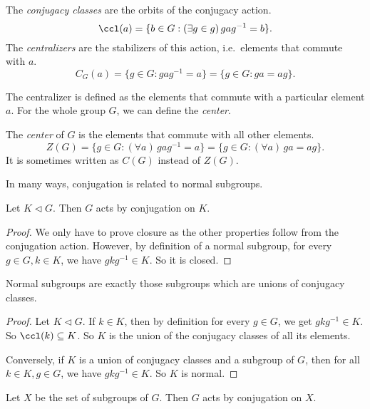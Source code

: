 \documentclass[a4paper]{article}
\begin{document}
\begin{defi}
  The \emph{conjugacy classes} are the orbits of the conjugacy action.
  \[
    \ccl(a) = \{b\in G: (\exists g\in g)\,gag^{-1} = b\}.
  \]
  The \emph{centralizers} are the stabilizers of this action, i.e.\ elements that commute with $a$.
  \[
    C_G(a) = \{g\in G: gag^{-1} = a\} = \{g\in G: ga = ag\}.
  \]
\end{defi}
The centralizer is defined as the elements that commute with a particular element $a$. For the whole group $G$, we can define the \emph{center}.

\begin{defi}
  The \emph{center} of $G$ is the elements that commute with all other elements.
  \[
    Z(G) = \{g\in G: (\forall a)\,gag^{-1} = a\} = \{g\in G: (\forall a)\,ga = ag\}.
  \]
  It is sometimes written as $C(G)$ instead of $Z(G)$.
\end{defi}

In many ways, conjugation is related to normal subgroups.
\begin{lemma}
  Let $K\lhd G$. Then $G$ acts by conjugation on $K$.
\end{lemma}

\begin{proof}
  We only have to prove closure as the other properties follow from the conjugation action. However, by definition of a normal subgroup, for every $g \in G, k \in K$, we have $gkg^{-1}\in K$. So it is closed.
\end{proof}

\begin{prop}
  Normal subgroups are exactly those subgroups which are unions of conjugacy classes.
\end{prop}

\begin{proof}
  Let $K\lhd G$. If $k\in K$, then by definition for every $g \in G$, we get $gkg^{-1}\in K$. So $\ccl(k)\subseteq K$. So $K$ is the union of the conjugacy classes of all its elements.

  Conversely, if $K$ is a union of conjugacy classes and a subgroup of $G$, then for all $k \in K, g \in G$, we have $gkg^{-1}\in K$. So $K$ is normal.
\end{proof}

\begin{lemma}
  Let $X$ be the set of subgroups of $G$. Then $G$ acts by conjugation on $X$.
\end{lemma}
\end{document}

